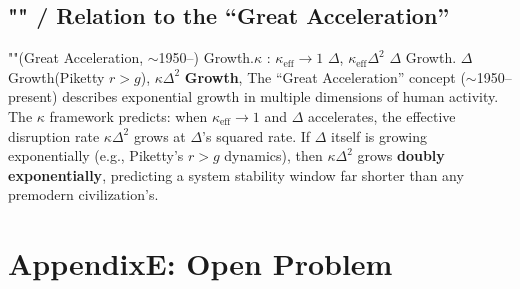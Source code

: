 \documentclass[11pt,a4paper]{article}
\theoremstyle{definition}
\newcommand{\coupling}{\kappa}
\begin{document}
\subsection{"" / Relation to the ``Great Acceleration''}
""(Great Acceleration, $\sim$1950--)
Growth.$\coupling$ : $\coupling_{\text{eff}} \to 1$
 $\Delta$, $\coupling_{\text{eff}} \Delta^2$ $\Delta$ Growth.
 $\Delta$ Growth(Piketty $r > g$), 
 $\coupling \Delta^2$ \textbf{Growth}, 
The ``Great Acceleration'' concept ($\sim$1950--present) describes exponential growth
in multiple dimensions of human activity. The $\coupling$ framework predicts: when
$\coupling_{\text{eff}} \to 1$ and $\Delta$ accelerates, the effective disruption rate
$\coupling \Delta^2$ grows at $\Delta$'s squared rate. If $\Delta$ itself is growing
exponentially (e.g., Piketty's $r > g$ dynamics), then $\coupling \Delta^2$ grows
\textbf{doubly exponentially}, predicting a system stability window far shorter than
any premodern civilization's.
\section{AppendixE: Open Problem}
\end{document}
